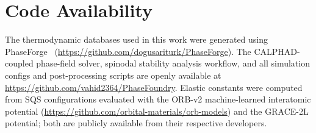 \section*{Code Availability}

The thermodynamic databases used in this work were generated using PhaseForge~\cite{phaseforge2025} (\url{https://github.com/dogusariturk/PhaseForge}). The CALPHAD-coupled phase-field solver, spinodal stability analysis workflow, and all simulation configs and post-processing scripts are openly available at \url{https://github.com/vahid2364/PhaseFoundry}. Elastic constants were computed from SQS configurations evaluated with the ORB-v2 machine-learned interatomic potential (\url{https://github.com/orbital-materials/orb-models}) and the GRACE-2L potential; both are publicly available from their respective developers.
